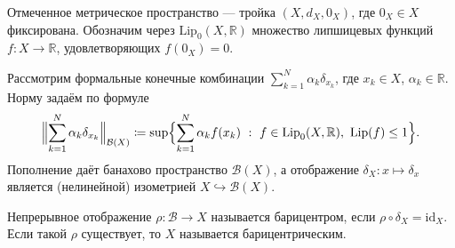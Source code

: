 \documentclass[../NDCNNAI_main.tex]{subfiles}
\begin{document}
\begin{definition}
Отмеченное метрическое пространство --- тройка $(X,d_X,0_X)$, где $0_X\in X$ фиксирована.
Обозначим через $\mathrm{Lip}_0(X,\mathbb{R})$ множество липшицевых функций $f\colon X\to\mathbb{R}$,
удовлетворяющих $f(0_X)=0$.
\end{definition}

\begin{definition}
Рассмотрим формальные конечные комбинации $\sum_{k=1}^N \alpha_k \delta_{x_k}$, где $x_k\in X$, $\alpha_k\in\mathbb{R}$.
Норму задаём по формуле
\[
\Bigl\|\sum_{k=1}^N \alpha_k \delta_{x_k}\Bigr\|_{\mathcal{B}(X)}
\coloneq \sup\Bigl\{\sum_{k=1}^N \alpha_k f(x_k)\ :\ f\in \mathrm{Lip}_0(X,\mathbb{R}),\ \mathrm{Lip}(f)\le 1\Bigr\}.
\]
Пополнение даёт банахово пространство $\mathcal{B}(X)$, а отображение $\delta_X\colon x\mapsto \delta_x$
является (нелинейной) изометрией $X\hookrightarrow \mathcal{B}(X)$.
\end{definition}

\begin{definition}
Непрерывное отображение $\rho\colon \mathcal{B}\to X$ называется барицентром, если
$\rho\circ \delta_X = \mathrm{id}_X$. Если такой $\rho$ существует, то $X$ называется барицентрическим.
\end{definition}
\end{document}
